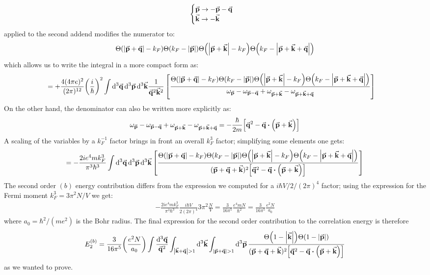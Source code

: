 \documentclass[a4paper]{article}
\newcommand{\Ta}{\Theta\pqty{\abs{\va{p}+\va{q}}-k_F}}
\newcommand{\Tbb}{\Theta\pqty{k_F - \abs{\va{p} + \va{k} + \va{q}}}}
\newcommand{\Tc}{\Theta\pqty{\abs{\va{p}+\va{k}}-k_F}}
\newcommand{\Tdd}{\Theta\pqty{k_F -\abs{\va{p}}}}
\begin{document}
\begin{equation}
\begin{cases}
\va{p}\rightarrow-\va{p} -\va{q}\\
\va{k} \rightarrow -\va{k}
\end{cases}
\end{equation}
applied to the second addend modifies the numerator to:
\begin{equation}
\Ta\Tdd\Tc\Tbb
\end{equation}
which allows us to write the integral in a more compact form as:
\begin{align}
= +\frac{4(4\pi e)^2}{(2\pi)^{12}} \pqty{\frac{i}{\hbar}}^2 \int \dd[3]{\va{q}}\dd[3]{\va{p}}\dd[3]{\va{k}}&\frac{1}{\va{q}^2 \va{k}^2}
\left[\frac{\Ta\Tdd\Tc\Tbb}{\omega_{\va{p}} -\omega_{\va{p}-\va{q}} +\omega_{\va{p}+\va{k}} - \omega_{\va{p}+\va{k}+ \va{q}}}\right]
\end{align}
On the other hand, the denominator can also be written more explicitly as:
\begin{align}
\omega_{\va{p}} -\omega_{\va{p}-\va{q}} +\omega_{\va{p}+\va{k}} - \omega_{\va{p}+\va{k}+ \va{q}}
=-\frac{\hbar}{2m} \bqty{\va{q}^2 - \va{q}\vdot\pqty{\va{p}+\va{k}}}
\end{align}
A scaling of the variables by a $k_F^{-1}$ factor brings in front an overall $k_F^3$ factor; simplifying some elements one gets:
\begin{align}
= -\frac{2ie^4mk_F^3}{\pi^3\hbar^3}\int \dd[3]{\va{q}}\dd[3]{\va{p}}\dd[3]{\va{k}}
\left[\frac{\Ta\Tdd\Tc\Tbb}{(\va{p}+\va{q}+\va{k})^2\bqty{\va{q}^2 - \va{q}\vdot\pqty{\va{p}+\va{k}}}}\right]
\end{align}
The second order $(b)$ energy contribution differs from the expression we computed for a $i\hbar V /2/(2\pi)^4$ factor; using the expression for the Fermi moment $k_F^3 = 3\pi^2N/V$ we get:
\begin{align*}
-\frac{2ie^4mk_F^3}{\pi^3\hbar^3} \frac{i\hbar V}{2(2\pi)^4} 3\pi^2\frac{N}{V} = \frac{3}{16\pi^5}\frac{e^4mN}{\hbar^2} = \frac{3}{16\pi^5} \frac{e^2N}{a_0}
\end{align*}
where $a_0 = \hbar^2/(me^2)$ is the Bohr radius.
The final expression for the second order contribution to the correlation energy is therefore
\begin{align}
E_2^{(b)} = \frac{3}{16\pi^5}\pqty{\frac{e^2N}{a_0}}\int\frac{\dd[3]{\va{q}}}{\va{q}^2}\int_{\abs{\va{k}+\va{q}}>1}\dd[3]{\va{k}}\int_{\abs{\va{p}+\va{q}}>1}\dd[3]{\va{p}}\frac{\Theta\pqty{1-\abs{\va{k}}}\Theta\pqty{1-\abs{\va{p}}}}{(\va{p}+\va{q}+\va{k})^2\bqty{\va{q}^2 - \va{q}\vdot\pqty{\va{p}+\va{k}}}}
\end{align}
as we wanted to prove.
\end{document}
